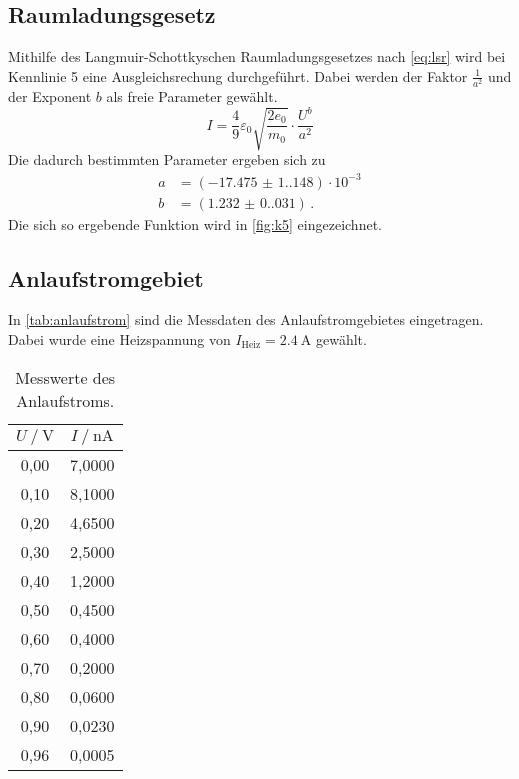 \subsection{Raumladungsgesetz}

Mithilfe des Langmuir-Schottkyschen Raumladungsgesetzes nach \autoref{eq:lsr} wird bei Kennlinie 5 eine Ausgleichsrechung durchgeführt. 
Dabei werden der Faktor $\frac{1}{a^{2}}$ und der Exponent $b$ als freie Parameter gewählt.
\begin{equation*}
  I= \frac{4}{9} \varepsilon_{0} \sqrt{\frac{2 e_{0}}{m_{0}}} \cdot \frac{U^{b}}{a^2}
\end{equation*}
Die dadurch bestimmten Parameter ergeben sich zu
\begin{align*}
  a &= (\num{-17.475(1.148)}) \cdot 10^{-3} \\
  b &= (\num{1.232(0.031)}) \, . 
\end{align*}
Die sich so ergebende Funktion wird in \autoref{fig:k5} eingezeichnet.


\subsection{Anlaufstromgebiet}

In \autoref{tab:anlaufstrom} sind die Messdaten des Anlaufstromgebietes eingetragen. Dabei wurde
eine Heizspannung von $I_{\text{Heiz}} = \qty{2.4}{\ampere}$ gewählt.
\begin{table}
  \centering
  \caption{Messwerte des Anlaufstroms.}
  \label{tab:anlaufstrom}
  \begin{tabular}{c c}
    \toprule
    $U \mathbin{/} \unit{\volt}$ &
    $I \mathbin{/} \unit{\nano\ampere}$ \\
    \midrule
    0,00 & 7,0000 \\
    0,10 & 8,1000 \\
    0,20 & 4,6500 \\
    0,30 & 2,5000 \\
    0,40 & 1,2000 \\
    0,50 & 0,4500 \\
    0,60 & 0,4000 \\
    0,70 & 0,2000 \\
    0,80 & 0,0600 \\
    0,90 & 0,0230 \\
    0,96 & 0,0005 \\
    \bottomrule
  \end{tabular}
\end{table}

